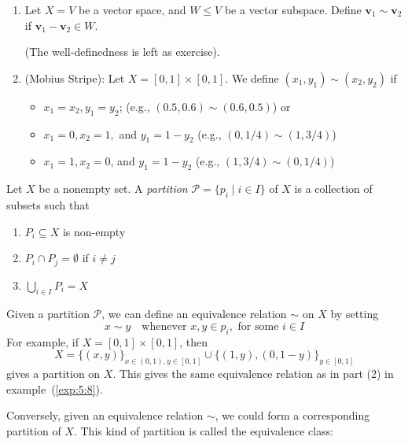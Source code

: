 \begin{example}\label{exp:5:8}
\begin{enumerate}
\item
Let $X=V$ be a vector space, and $W\le V$ be a vector subspace. 
Define $\bm v_1\sim \bm v_2$ if $\bm v_1-\bm v_2\in W$.

(The well-definedness is left as exercise).
\item
(Mobius Stripe):
Let $X=[0,1]\times[0,1]$.
We define $(x_1,y_1)\sim(x_2,y_2)$ if 
\begin{itemize}
\item
$x_1=x_2, y_1=y_2$; (e.g., $(0.5,0.6)\sim(0.6,0.5)$) or
\item
$x_1=0,x_2=1,$ and $y_1=1-y_2$ (e.g., $(0,1/4)\sim(1,3/4)$)
\item
$x_1=1,x_2=0$, and $y_1=1-y_2$ (e.g., $(1,3/4)\sim(0,1/4)$)
\end{itemize}
\end{enumerate}
\end{example}
\begin{definition}[Partition]
Let $X$ be a nonempty set. A \emph{partition} $\mathcal{P}=\{p_i\mid i\in I\}$ of $X$ is a collection of subsets such that
\begin{enumerate}
\item
$P_i\subseteq X$ is non-empty
\item
$P_i\cap P_j=\emptyset$ if $i\ne j$
\item
$\bigcup_{i\in I}P_i=X$
\end{enumerate}
\end{definition}
\begin{remark}
Given a partition $\mathcal{P}$, we can define an equivalence relation $\sim$ on $X$ by setting
\[
x\sim y\quad
\text{whenever }x,y\in p_i,\text{ for some $i\in I$}
\]
For example, if $X=[0,1]\times[0,1]$, then 
\[
X=\{(x,y)\}_{x\in(0,1),y\in[0,1]}\cup\{(1,y),(0,1-y)\}_{y\in[0,1]}
\]
gives a partition on $X$. 
This gives the same equivalence relation as in part (2) in example~(\ref{exp:5:8}).
\end{remark}
Conversely, given an equivalence relation $\sim$, we could form a corresponding partition of $X$. This kind of partition is called the equivalence class:

